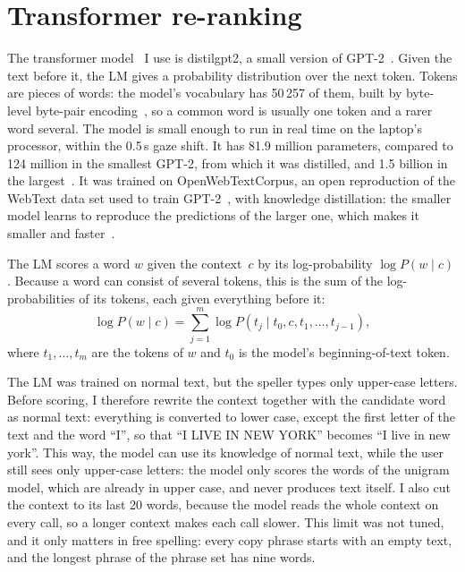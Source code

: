 \section{Transformer re-ranking}
\label{sec:reranking}

The transformer model~\citep{vaswani2017attention} I use is distilgpt2, a small version
of GPT-2~\citep{radford2019gpt2,sanh2019distilbert}. Given the text before it, the
\ac{LM} gives a probability distribution over the next token. Tokens are pieces of
words: the model's vocabulary has 50\,257 of them, built by byte-level byte-pair
encoding~\citep{radford2019gpt2}, so a common word is usually one token and a rarer
word several. The model is small enough to run in real time on the laptop's processor,
within the 0.5\,s gaze shift. It has 81.9 million parameters, compared to 124 million
in the smallest GPT-2, from which it was distilled, and 1.5 billion in the
largest~\citep{radford2019gpt2,distilgpt2card}. It was trained on OpenWebTextCorpus, an
open reproduction of the WebText data set used to train GPT-2~\citep{distilgpt2card},
with knowledge distillation: the smaller model learns to reproduce the predictions of
the larger one, which makes it smaller and faster~\citep{sanh2019distilbert}.

The \ac{LM} scores a word $w$ given the context~$c$ by its log-probability
$\log P(w \mid c)$. Because a word can consist of several tokens, this is the sum of
the log-probabilities of its tokens, each given everything before it:
\begin{equation}
    \log P(w \mid c) = \sum_{j=1}^{m} \log P(t_j \mid t_0, c, t_1, \dots, t_{j-1}),
    \label{eq:lm-score}
\end{equation}
where $t_1, \dots, t_m$ are the tokens of $w$ and $t_0$ is the model's
beginning-of-text token.

The \ac{LM} was trained on normal text, but the speller types only upper-case letters.
Before scoring, I therefore rewrite the context together with the candidate word as
normal text: everything is converted to lower case, except the first letter of the text
and the word \enquote{I}, so that \enquote{I LIVE IN NEW YORK} becomes \enquote{I live
in new york}. This way, the model can use its knowledge of normal text, while the user
still sees only upper-case letters: the model only scores the words of the unigram
model, which are already in upper case, and never produces text itself. I also cut the
context to its last 20 words, because the model reads the whole context on every call,
so a longer context makes each call slower. This limit was not tuned, and it only
matters in free spelling: every copy phrase starts with an empty text, and the longest
phrase of the phrase set has nine words.

